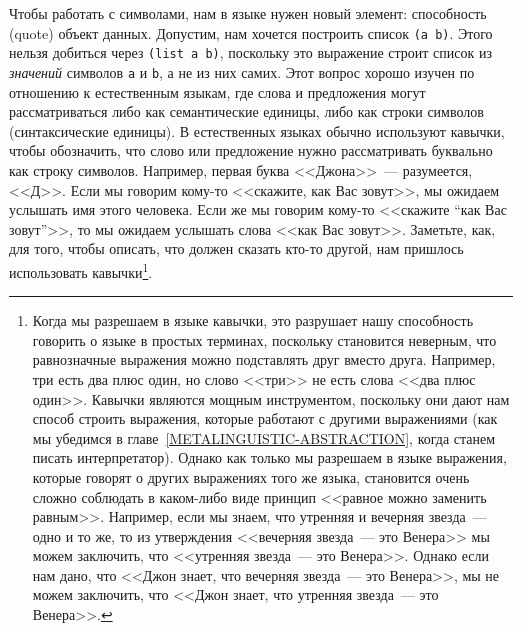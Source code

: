 Чтобы работать с символами, нам в языке нужен новый
элемент: способность  (quote) объект
данных.  Допустим, нам хочется построить список {\tt (a b)}.
Этого нельзя добиться через {\tt (list a b)}, поскольку это
выражение строит список из {\em значений} символов
{\tt a} и {\tt b}, а не из них самих. Этот вопрос
хорошо изучен по отношению к естественным языкам, где слова и
предложения могут рассматриваться либо как семантические единицы,
либо как строки символов (синтаксические единицы). 
 В естественных языках обычно используют кавычки, чтобы обозначить, что  
слово или предложение нужно рассматривать буквально как строку
символов.  Например, первая буква <<Джона>>~--- разумеется,
<<Д>>.  Если мы говорим кому-то <<скажите, как Вас зовут>>, мы ожидаем
услышать имя этого человека.  Если же мы говорим кому-то <<скажите
``как Вас зовут''>>, то мы ожидаем услышать слова <<как Вас зовут>>.
Заметьте, как, для того, чтобы описать, что должен сказать кто-то другой, 
нам пришлось использовать кавычки\footnote{Когда мы разрешаем в языке кавычки, это разрушает нашу
способность говорить о языке в простых терминах, поскольку становится
неверным, что равнозначные выражения можно подставлять друг вместо
друга.  Например, три есть два плюс один, но слово <<три>> не есть
слова <<два плюс один>>.  Кавычки являются мощным инструментом,
поскольку они дают нам способ строить выражения, которые работают с
другими выражениями (как мы убедимся в главе~\ref{METALINGUISTIC-ABSTRACTION}, когда станем
писать интерпретатор).  Однако как только мы разрешаем в языке выражения,
которые говорят о других выражениях того же языка, становится очень
сложно соблюдать в каком-либо виде принцип <<равное можно
заменить равным>>.  Например, если мы знаем, что утренняя и вечерняя
звезда~--- одно и то же, то из утверждения  
<<вечерняя
звезда~--- это Венера>> мы можем заключить, что <<утренняя звезда~---
это Венера>>. Однако если нам дано, что <<Джон знает, что вечерняя звезда~--- это
Венера>>, мы не можем заключить, что <<Джон знает, что утренняя звезда~--- это Венера>>.}.

